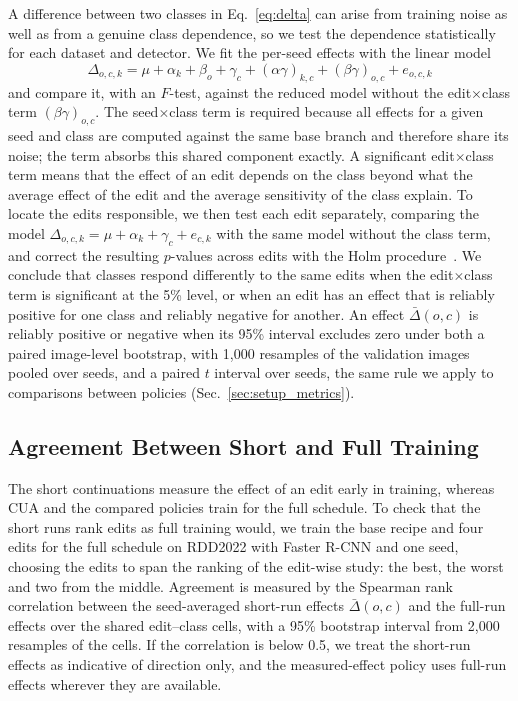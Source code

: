 \documentclass[conference]{IEEEtran}
\begin{document}
A difference between two classes in Eq.~\eqref{eq:delta} can arise from training noise as well as from a genuine class dependence, so we test the dependence statistically for each dataset and detector. We fit the per-seed effects with the linear model
\begin{equation}
\Delta_{o,c,k}=\mu+\alpha_k+\beta_o+\gamma_c+(\alpha\gamma)_{k,c}+(\beta\gamma)_{o,c}+e_{o,c,k}
\label{eq:anova}
\end{equation}
and compare it, with an $F$-test, against the reduced model without the edit$\times$class term $(\beta\gamma)_{o,c}$. The seed$\times$class term is required because all effects for a given seed and class are computed against the same base branch and therefore share its noise; the term absorbs this shared component exactly. A significant edit$\times$class term means that the effect of an edit depends on the class beyond what the average effect of the edit and the average sensitivity of the class explain. To locate the edits responsible, we then test each edit separately, comparing the model $\Delta_{o,c,k}=\mu+\alpha_k+\gamma_c+e_{c,k}$ with the same model without the class term, and correct the resulting $p$-values across edits with the Holm procedure~\cite{holm1979}. We conclude that classes respond differently to the same edits when the edit$\times$class term is significant at the 5\% level, or when an edit has an effect that is reliably positive for one class and reliably negative for another. An effect $\bar\Delta(o,c)$ is reliably positive or negative when its 95\% interval excludes zero under both a paired image-level bootstrap, with 1,000 resamples of the validation images pooled over seeds, and a paired $t$ interval over seeds, the same rule we apply to comparisons between policies (Sec.~\ref{sec:setup_metrics}).

\subsection{Agreement Between Short and Full Training}
\label{sec:measure_proxy}

The short continuations measure the effect of an edit early in training, whereas CUA and the compared policies train for the full schedule. To check that the short runs rank edits as full training would, we train the base recipe and four edits for the full schedule on RDD2022 with Faster R-CNN and one seed, choosing the edits to span the ranking of the edit-wise study: the best, the worst and two from the middle. Agreement is measured by the Spearman rank correlation between the seed-averaged short-run effects $\bar\Delta(o,c)$ and the full-run effects over the shared edit--class cells, with a 95\% bootstrap interval from 2,000 resamples of the cells. If the correlation is below 0.5, we treat the short-run effects as indicative of direction only, and the measured-effect policy uses full-run effects wherever they are available.
\end{document}
